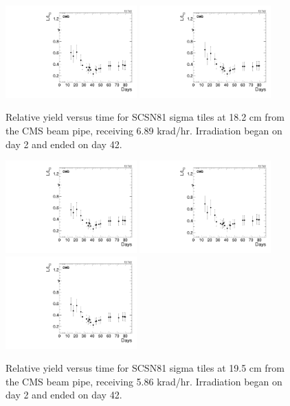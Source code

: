 \begin{figure}[tbp!]
\centering
\includegraphics[width=0.45\textwidth]{figures/SCSN81-S-18p2cm-f5ch0-time.pdf}
\includegraphics[width=0.45\textwidth]{figures/SCSN81-S-18p2cm-f20ch5-time.pdf}
\caption{Relative yield versus time for SCSN81 sigma tiles at 18.2 cm from the CMS beam pipe, receiving 6.89 krad/hr. Irradiation began on day 2 and ended on day 42.}
\label{fig:SCSN81-S-18p2cm-time}
\end{figure} 

\begin{figure}[tbp!]
\centering
\includegraphics[width=0.45\textwidth]{figures/SCSN81-S-19p5cm-f2ch1-time.pdf}
\includegraphics[width=0.45\textwidth]{figures/SCSN81-S-19p5cm-f15ch1-time.pdf}
\includegraphics[width=0.45\textwidth]{figures/SCSN81-S-19p5cm-f20ch4-time.pdf}
\caption{Relative yield versus time for SCSN81 sigma tiles at 19.5 cm from the CMS beam pipe, receiving 5.86 krad/hr. Irradiation began on day 2 and ended on day 42.}
\label{fig:SCSN81-S-19p5cm-time}
\end{figure} 

